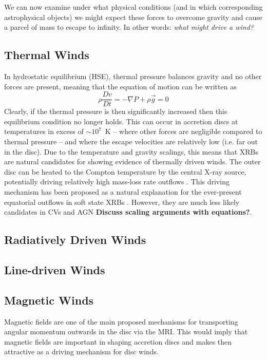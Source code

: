 We can now examine under what physical conditions 
(and in which corresponding astrophysical objects)
we might expect these forces to overcome gravity and 
cause a parcel of mass to escape to infinity.
In other words: {\em what might drive a wind?}

\subsection{Thermal Winds}

In hydrostatic equilibrium (HSE), thermal pressure balances gravity and no other forces 
are present, meaning that the equation of motion can be written as 
\begin{equation}
\label{eq:hse}
\rho \frac{Dv}{Dt} = -\nabla P +  \rho \vec{g} = 0
\end{equation}
Clearly, if the thermal pressure is then significantly 
increased then this equilibrium condition no longer holds. 
This can occur in accretion discs at temperatures in excess of $\sim10^7$~K --
where other forces are negligible compared to thermal pressure -- 
and where the escape velocities are relatively low (i.e. far out in the disc).
Due to the temperature and gravity scalings, this means
that XRBs are natural candidates for showing evidence of thermally driven
winds. The outer disc can be heated to the Compton temperature by the central X-ray source,
potentially driving relatively high mass-loss rate outflows \citep{begelman1983,woods1996}. 
This driving mechanism has been proposed as a natural explanation
for the ever-present equatorial outflows in soft state XRBs \citep{ponti2012}.
However, they are much less likely candidates in CVs and AGN {\bf Discuss scaling
arguments with equations?}.

\subsection{Radiatively Driven Winds}
\label{sec:rad_winds}



\subsection{Line-driven Winds}

\subsection{Magnetic Winds}
\label{sec:magq_winds}

Magnetic fields are one of the main proposed mechanisms for transporting
angular momentum outwards in the disc via the MRI. This would imply
that magnetic fields are important in shaping accretion discs and makes
then attractive as a driving mechanism for disc winds.

